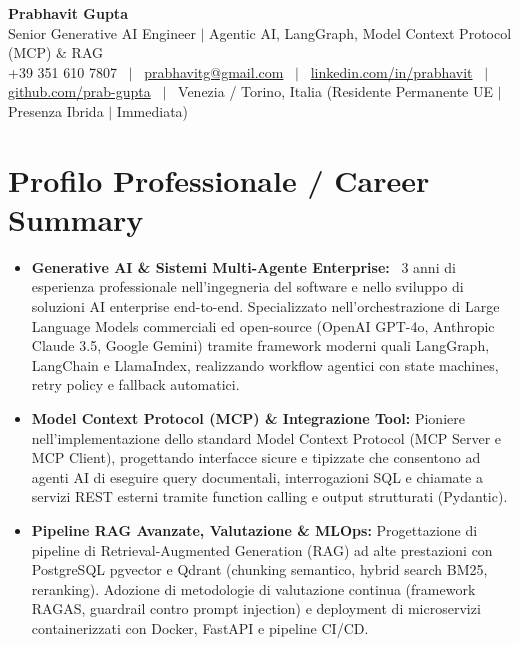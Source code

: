 \documentclass[a4paper,10pt]{article}
\begin{document}
\begin{minipage}[c]{0.80\textwidth}
  {\Huge\bfseries Prabhavit Gupta}\\[3pt]
  {\color{accent}\large Senior Generative AI Engineer $\vert$ Agentic AI, LangGraph, Model Context Protocol (MCP) $\&$ RAG}\\[6pt]
  {\footnotesize +39 351 610 7807 ~$\vert$~
  \href{mailto:prabhavitg@gmail.com}{prabhavitg@gmail.com} ~$\vert$~
  \href{https://www.linkedin.com/in/prabhavit/}{linkedin.com/in/prabhavit} ~$\vert$~
  \href{https://github.com/prab-gupta}{github.com/prab-gupta} ~$\vert$~
  Venezia / Torino, Italia (Residente Permanente UE $\vert$ Presenza Ibrida $\vert$ Immediata)}
\end{minipage}\hfill

\vspace{6pt}

\section{Profilo Professionale / Career Summary}
\begin{itemize}
  \item \textbf{Generative AI \& Sistemi Multi-Agente Enterprise:} ~3 anni di esperienza professionale nell'ingegneria del software e nello sviluppo di soluzioni AI enterprise end-to-end. Specializzato nell'orchestrazione di Large Language Models commerciali ed open-source (OpenAI GPT-4o, Anthropic Claude 3.5, Google Gemini) tramite framework moderni quali LangGraph, LangChain e LlamaIndex, realizzando workflow agentici con state machines, retry policy e fallback automatici.
  \item \textbf{Model Context Protocol (MCP) \& Integrazione Tool:} Pioniere nell'implementazione dello standard Model Context Protocol (MCP Server e MCP Client), progettando interfacce sicure e tipizzate che consentono ad agenti AI di eseguire query documentali, interrogazioni SQL e chiamate a servizi REST esterni tramite function calling e output strutturati (Pydantic).
  \item \textbf{Pipeline RAG Avanzate, Valutazione \& MLOps:} Progettazione di pipeline di Retrieval-Augmented Generation (RAG) ad alte prestazioni con PostgreSQL pgvector e Qdrant (chunking semantico, hybrid search BM25, reranking). Adozione di metodologie di valutazione continua (framework RAGAS, guardrail contro prompt injection) e deployment di microservizi containerizzati con Docker, FastAPI e pipeline CI/CD.
\end{itemize}
\end{document}
